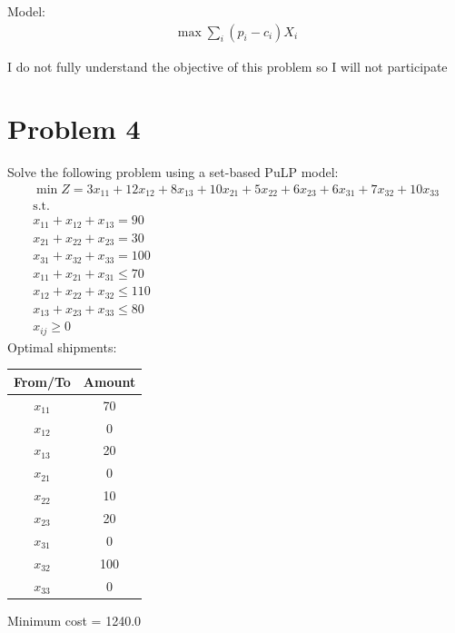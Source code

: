 \documentclass[10pt]{article}
\begin{document}
Model: 
\begin{gather*}
    \max\sum_i(p_i - c_i)X_i
\end{gather*}

I do not fully understand the objective of this problem so I will not participate 

\newpage
\section{Problem 4}
Solve the following problem using a set-based PuLP model: 
\begin{gather*}
    \min Z = 3x_{11} + 12x_{12} + 8x_{13} + 10x_{21} + 5x_{22} + 6x_{23} + 6x_{31} + 7x_{32} + 10x_{33}\\
    \text{s.t.}\\
    x_{11} + x_{12} + x_{13} = 90\\
    x_{21} + x_{22} + x_{23} = 30\\
    x_{31} + x_{32} + x_{33} = 100\\
    x_{11} + x_{21} + x_{31} \le 70\\
    x_{12} + x_{22} + x_{32} \le 110\\
    x_{13} + x_{23} + x_{33} \le 80\\
    x_{ij} \ge 0
\end{gather*}
Optimal shipments:
\begin{center}
    \begin{tabular}{|c|c|}
        \hline 
        \textbf{From/To} & \textbf{Amount}\\\hline 
        $x_{11}$ & 70\\\hline 
        $x_{12}$ & 0\\\hline 
        $x_{13}$ & 20\\\hline 
        $x_{21}$ & 0\\\hline 
        $x_{22}$ & 10\\\hline 
        $x_{23}$ & 20\\\hline 
        $x_{31}$ & 0\\\hline 
        $x_{32}$ & 100\\\hline 
        $x_{33}$ & 0\\\hline 
    \end{tabular}
\end{center}
Minimum cost = 1240.0
\newpage 
\end{document}
